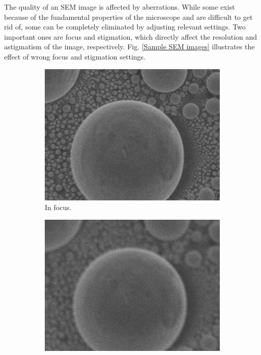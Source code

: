 \documentclass[conference]{IEEEtran}
\begin{document}
The quality of an SEM image is affected by aberrations. While some exist because of the fundamental properties of the microscope and are difficult to get rid of, some can be completely eliminated by adjusting relevant settings. Two important ones are focus and stigmation, which directly affect the resolution and astigmatism of the image, respectively. Fig. \ref{Sample SEM images} illustrates the effect of wrong focus and stigmation settings.

\begin{figure}[htbp]
    \centering
    \begin{subfigure}{0.4\textwidth}
        \centering
        \includegraphics[width=1\textwidth]{Images/A in focus.jpg}
        \caption{In focus.}
        \label{A in focus}
    \end{subfigure}
    \begin{subfigure}{0.4\textwidth}
        \centering
        \includegraphics[width=1\textwidth]{Images/A out of focus.jpg}

\end{subfigure}
\end{figure}
\end{document}
